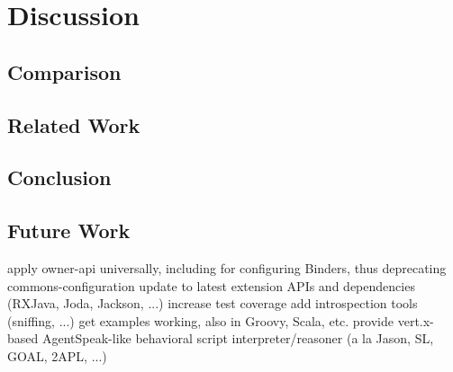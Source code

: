 \documentclass{aamas2015}
\begin{document}
\section{Discussion}
\label{sec:discussion}

\subsection{Comparison}

\subsection{Related Work}

\subsection{Conclusion}
 
\subsection{Future Work}


apply owner-api universally, including for configuring Binders, thus deprecating commons-configuration
update to latest extension APIs and dependencies (RXJava, Joda, Jackson, ...)
increase test coverage
add introspection tools (sniffing, ...)
get examples working, also in Groovy, Scala, etc.
provide vert.x-based AgentSpeak-like behavioral script interpreter/reasoner (a la Jason, SL, GOAL, 2APL, ...)
\end{document}
